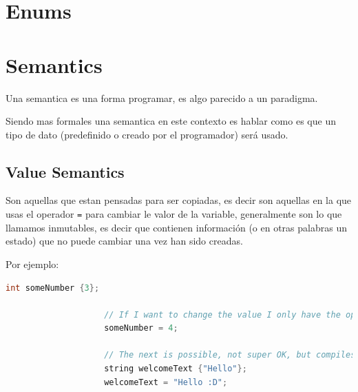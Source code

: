 \documentclass[12pt, fleqn]{report}                             %
\theoremstyle{break}                                            %
\newcommand{\textCode}[1]  { \texttt{#1} }                      %
\begin{document}
        \section{Enums}


        \clearpage
        \section{Semantics}   

            Una semantica es una forma programar, es algo parecido a un paradigma.
            
            Siendo mas formales una semantica en este contexto es hablar
            como es que un tipo de dato (predefinido o creado por el programador) será usado.

            \subsection{Value Semantics}  
            
                Son aquellas que estan pensadas para ser copiadas, es decir son aquellas en la que usas
                el operador \textCode{=} para cambiar le valor de la variable, generalmente son lo que llamamos
                inmutables, es decir que contienen información (o en otras palabras un estado) que no puede
                cambiar una vez han sido creadas.

                Por ejemplo:
                \begin{lstlisting}[language=C++, gobble=20]
                    int someNumber {3};

                    // If I want to change the value I only have the option to use =
                    someNumber = 4;

                    // The next is possible, not super OK, but compiles
                    string welcomeText {"Hello"};
                    welcomeText = "Hello :D";
                \end{lstlisting}
            
\end{document}
